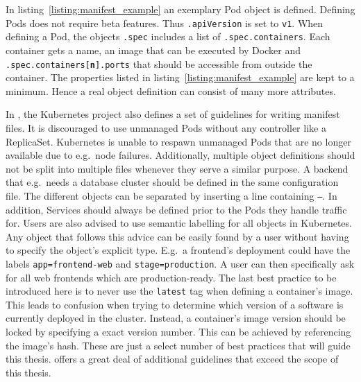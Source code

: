 In listing~\ref{listing:manifest_example} an exemplary Pod object is defined.
Defining Pods does not require beta features. Thus \texttt{.apiVersion} is set
to \texttt{v1}. When defining a Pod, the objects \texttt{.spec} includes a list
of \texttt{.spec.containers}. Each container gets a name, an image that can be
executed by Docker and \texttt{.spec.containers[\textbf{n}].ports} that should
be accessible from outside the container. The properties listed in
listing~\ref{listing:manifest_example} are kept to a minimum. Hence a real
object definition can consist of many more attributes.

In \autocite{AuthorsConfigurationBestPractices2019}, the Kubernetes project
also defines a set of guidelines for writing manifest files. It is discouraged
to use unmanaged Pods without any controller like a ReplicaSet. Kubernetes is
unable to respawn unmanaged Pods that are no longer available due to e.g.\ node
failures. Additionally, multiple object definitions should not be split into
multiple files whenever they serve a similar purpose. A backend that e.g.\
needs a database cluster should be defined in the same configuration file. The
different objects can be separated by inserting a line containing \texttt{---}.
In addition, Services should always be defined prior to the Pods they handle
traffic for. Users are also advised to use semantic labelling for all objects
in Kubernetes. Any object that follows this advice can be easily found by a
user without having to specify the object's explicit type. E.g.\ a frontend's
deployment could have the labels \texttt{app=frontend-web} and
\texttt{stage=production}. A user can then specifically ask for all web
frontends which are production-ready. The last best practice to be introduced
here is to never use the \texttt{latest} tag when defining a container's image.
This leads to confusion when trying to determine which version of a software is
currently deployed in the cluster. Instead, a container's image version should
be locked by specifying a exact version number. This can be achieved by
referencing the image's hash. These are just a select number of best practices
that will guide this thesis. \autocite{AuthorsConfigurationBestPractices2019}
offers a great deal of additional guidelines that exceed the scope of this
thesis.
